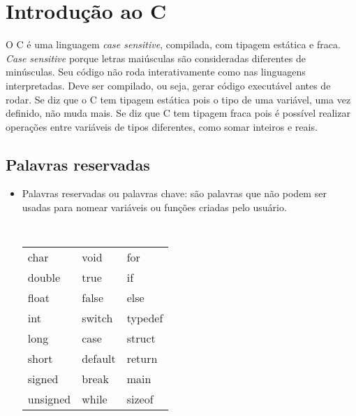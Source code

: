 
\chapter{Introdução ao C}

\setcounter{page}{1}    %

O C é uma linguagem {\it case sensitive}, compilada, com tipagem estática e fraca. 
{\it Case sensitive} porque letras maiúsculas são consideradas diferentes de minúsculas. Seu código não roda interativamente como nas linguagens interpretadas. Deve ser compilado, ou seja, gerar código executável antes de rodar. Se diz que o C tem tipagem estática pois o tipo de uma variável, uma vez definido, não muda mais. Se diz que C tem tipagem fraca pois é possível realizar operações entre variáveis de tipos diferentes, como somar inteiros e reais.



\section{Palavras reservadas}

\begin{itemize}

\item Palavras reservadas ou palavras chave: são palavras que não podem ser usadas para nomear variáveis ou funções criadas pelo usuário.

{\tt
\begin{tabular}{lll}
char     & void     & for     \\
double   & true     & if      \\
float    & false    & else    \\
int      & switch   & typedef \\
long     & case     & struct  \\
short    & default  & return  \\
signed   & break    & main    \\
unsigned & while    & sizeof  \\
\end{tabular}
}


\end{itemize}


